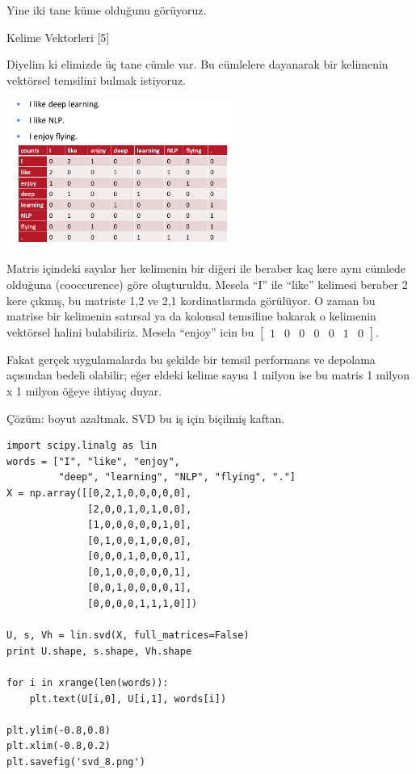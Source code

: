 \documentclass[12pt,fleqn]{article}\usepackage{../../common}
\begin{document}
Yine iki tane küme olduğunu görüyoruz. 

Kelime Vektorleri [5]

Diyelim ki elimizde üç tane cümle var. Bu cümlelere dayanarak bir kelimenin
vektörsel temsilini bulmak istiyoruz. 

\includegraphics[width=20em]{svd_7.png}

Matris içindeki sayılar her kelimenin bir diğeri ile beraber kaç kere aynı
cümlede olduğuna (cooccurence) göre oluşturuldu. Mesela ``I'' ile ``like''
kelimesi beraber 2 kere çıkmış, bu matriste 1,2 ve 2,1 kordinatlarında
görülüyor.  O zaman bu matrise bir kelimenin satırsal ya da kolonsal
temsiline bakarak o kelimenin vektörsel halini bulabiliriz. Mesela
``enjoy'' icin bu $\left[\begin{array}{cccccccc} 1&0&0&0&0&1&0 \end{array}\right]$.

Fakat gerçek uygulamalarda bu şekilde bir temsil performans ve depolama
açısından bedeli olabilir; eğer eldeki kelime sayısı 1 milyon ise bu matris
1 milyon x 1 milyon öğeye ihtiyaç duyar. 

Çözüm: boyut azaltmak. SVD bu iş için biçilmiş kaftan. 

\begin{verbatim}
import scipy.linalg as lin
words = ["I", "like", "enjoy",
         "deep", "learning", "NLP", "flying", "."]
X = np.array([[0,2,1,0,0,0,0,0],
              [2,0,0,1,0,1,0,0],
              [1,0,0,0,0,0,1,0],
              [0,1,0,0,1,0,0,0],
              [0,0,0,1,0,0,0,1],
              [0,1,0,0,0,0,0,1],
              [0,0,1,0,0,0,0,1],
              [0,0,0,0,1,1,1,0]])

U, s, Vh = lin.svd(X, full_matrices=False)
print U.shape, s.shape, Vh.shape

for i in xrange(len(words)):
    plt.text(U[i,0], U[i,1], words[i])

plt.ylim(-0.8,0.8)
plt.xlim(-0.8,0.2)              
plt.savefig('svd_8.png')
\end{verbatim}
\end{document}
